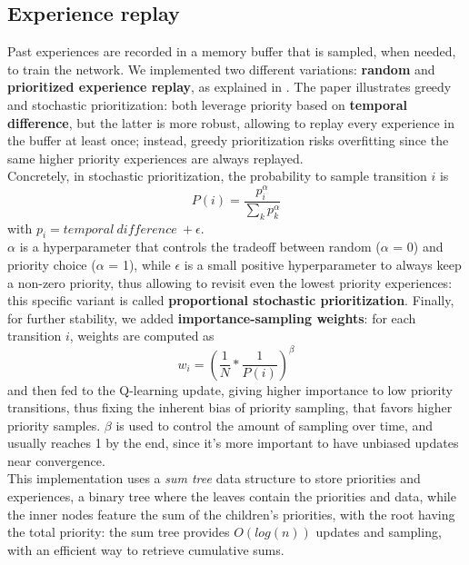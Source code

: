 \subsection{Experience replay}
Past experiences are recorded in a memory buffer that is sampled, when needed, to train the network. We implemented two different variations: \textbf{random} and \textbf{prioritized experience replay}, as explained in \cite{priority}. The paper illustrates greedy and stochastic prioritization: both leverage priority based on \textbf{temporal difference}, but the latter is more robust, allowing to replay every experience in the buffer at least once; instead, greedy prioritization risks overfitting since the same higher priority experiences are always replayed. \\
\noindent
Concretely, in stochastic prioritization, the probability to sample transition $i$ is $$P(i) = \frac{p_i^\alpha}{\sum_k p_k^\alpha}$$ with $p_i = temporal\ difference\ + \epsilon$. \\
$\alpha$ is a hyperparameter that controls the tradeoff between random ($\alpha$ = 0) and priority choice ($\alpha$ = 1), while $\epsilon$ is a small positive hyperparameter to always keep a non-zero priority, thus allowing to revisit even the lowest priority experiences: this specific variant is called \textbf{proportional stochastic prioritization}. Finally, for further stability, we added \textbf{importance-sampling weights}: for each transition $i$, weights are computed as $$w_i = (\frac{1}{N} * \frac{1}{P(i)})^\beta$$ and then fed to the Q-learning update, giving higher importance to low priority transitions, thus fixing the inherent bias of priority sampling, that favors higher priority samples. $\beta$ is used to control the amount of sampling over time, and usually reaches 1 by the end, since it's more important to have unbiased updates near convergence.\\
\noindent
This implementation uses a \textit{sum tree} data structure to store priorities and experiences, a binary tree where the leaves contain the priorities and data, while the inner nodes feature the sum of the children's priorities, with the root having the total priority: the sum tree provides $O(log(n))$ updates and sampling, with an efficient way to retrieve cumulative sums.
\noindent

